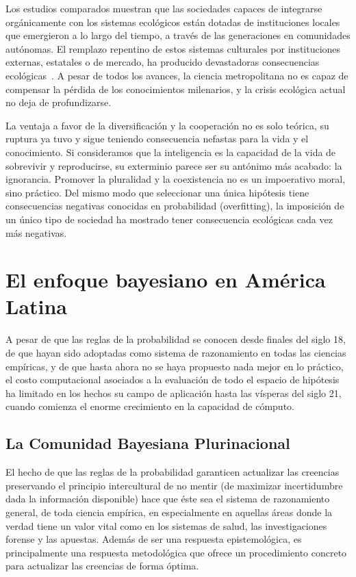 \documentclass[a4paper,11pt]{book}
\theoremstyle{definition}
\begin{document}

Los estudios comparados muestran que las sociedades capaces de integrarse orgánicamente con los sistemas ecológicos están dotadas de instituciones locales que emergieron a lo largo del tiempo, a través de las generaciones en comunidades autónomas.
%
El remplazo repentino de estos sistemas culturales por instituciones externas, estatales o de mercado, ha producido devastadoras consecuencias ecológicas~\cite{segato2013-colonialidad}.
%
A pesar de todos los avances, la ciencia metropolitana no es capaz de compensar la pérdida de los conocimientos milenarios, y la crisis ecológica actual no deja de profundizarse.


La ventaja a favor de la diversificación y la cooperación no es solo teórica, su ruptura ya tuvo y sigue teniendo consecuencia nefastas para la vida y el conocimiento.
%
Si consideramos que la inteligencia es la capacidad de la vida de sobrevivir y reproducirse, su exterminio parece ser su antónimo más acabado: la ignorancia.
%
Promover la pluralidad y la coexistencia no es un impoerativo moral, sino práctico.
%
Del mismo modo que seleccionar una única hipótesis tiene consecuencias negativas conocidas en probabilidad (overfitting), la imposición de un único tipo de sociedad ha mostrado tener consecuencia ecológicas cada vez más negativas.

\section{El enfoque bayesiano en América Latina} \label{sec:bayesplurinacional}

A pesar de que las reglas de la probabilidad se conocen desde finales del siglo 18, de que hayan sido adoptadas como sistema de razonamiento en todas las ciencias empíricas, y de que hasta ahora no se haya propuesto nada mejor en lo práctico, el costo computacional asociados a la evaluación de todo el espacio de hipótesis ha limitado en los hechos su campo de aplicación hasta las vísperas del siglo 21, cuando comienza el enorme crecimiento en la capacidad de cómputo.

\subsection{La Comunidad Bayesiana Plurinacional}

%
El hecho de que las reglas de la probabilidad garanticen actualizar las creencias preservando el principio intercultural de no mentir (de maximizar incertidumbre dada la información disponible) hace que éste sea el sistema de razonamiento general, de toda ciencia empírica, en especialmente en aquellas áreas donde la verdad tiene un valor vital como en los sistemas de salud, las investigaciones forense y las apuestas.
%
Además de ser una respuesta epistemológica, es principalmente una respuesta metodológica que ofrece un procedimiento concreto para actualizar las creencias de forma óptima.
\end{document}
